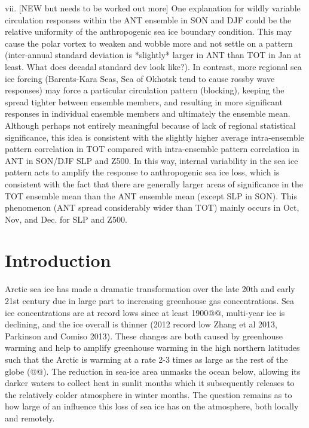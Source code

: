 \documentclass[twocol]{ametsoc}
\begin{document}
vii. [NEW but needs to be worked out more] One explanation for wildly variable circulation responses within the ANT ensemble in SON and DJF could be the relative uniformity of the anthropogenic sea ice boundary condition. This may cause the polar vortex to weaken and wobble more and not settle on a pattern (inter-annual standard deviation is *slightly* larger in ANT than TOT in Jan at least. What does decadal standard dev look like?). In contrast, more regional sea ice forcing (Barents-Kara Seas, Sea of Okhotsk tend to cause rossby wave responses) may force a particular circulation pattern (blocking), keeping the spread tighter between ensemble members, and resulting in more significant responses in individual ensemble members and ultimately the ensemble mean. Although perhaps not entirely meaningful because of lack of regional statistical significance, this idea is consistent with the slightly higher average intra-ensemble pattern correlation in TOT compared with intra-ensemble pattern correlation in ANT in SON/DJF SLP and Z500. In this way, internal variability in the sea ice pattern acts to amplify the response to anthropogenic sea ice loss, which is consistent with the fact that there are generally larger areas of significance in the TOT ensemble mean than the ANT ensemble mean (except SLP in SON). This phenomenon (ANT spread considerably wider than TOT) mainly occurs in Oct, Nov, and Dec. for SLP and Z500. \\



\section{Introduction}

Arctic sea ice has made a dramatic transformation over the late 20th and early 21st century due in large part to increasing greenhouse gas concentrations. Sea ice concentrations are at record lows since at least 1900@@, multi-year ice is declining, and the ice overall is thinner (2012 record low Zhang et al 2013, Parkinson and Comiso 2013). These changes are both caused by greenhouse warming and help to amplify greenhouse warming in the high northern latitudes such that the Arctic is warming at a rate 2-3 times as large as the rest of the globe (@@). The reduction in sea-ice area unmasks the ocean below, allowing its darker waters to collect heat in sunlit months which it subsequently releases to the relatively colder atmosphere in winter months. The question remains as to how large of an influence this loss of sea ice has on the atmosphere, both locally and remotely. %
\end{document}

